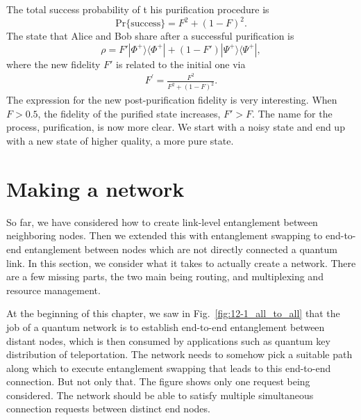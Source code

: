 The total success probability of t  his purification procedure is
\begin{equation}
    \text{Pr} \{\text{success}\} = F^2 + (1 - F)^2.
\end{equation}
The state that Alice and Bob share after a successful purification is
\begin{equation}
    \rho = F' |\Phi^+\rangle\langle\Phi^+| + (1 - F') |\Psi^+\rangle\langle\Psi^+|,
\end{equation}
where the new fidelity $F'$ is related to the initial one via
\begin{align}
    F^{\prime}=\frac{F^{2}}{F^{2}+(1-F)^{2}}.
\end{align}
The expression for the new post-purification fidelity is very interesting.
When $F > 0.5$, the fidelity of the purified state increases, $F' > F$.
The name for the process, purification, is now more clear.
We start with a noisy state and end up with a new state of higher quality, a more pure state.




\section{Making a network}


So far, we have considered how to create link-level entanglement between neighboring nodes.
Then we extended this with entanglement swapping to end-to-end entanglement between nodes which are not directly connected a quantum link.
In this section, we consider what it takes to actually create a network.
There are a few missing parts, the two main being routing, and multiplexing and resource management.

At the beginning of this chapter, we saw in Fig.~\ref{fig:12-1_all_to_all} that the job of a quantum network is to establish end-to-end entanglement between distant nodes, which is then consumed by applications such as quantum key distribution of teleportation.
The network needs to somehow pick a suitable path along which to execute entanglement swapping that leads to this end-to-end connection.
But not only that.
The figure shows only one request being considered.
The network should be able to satisfy multiple simultaneous connection requests between distinct end nodes.

